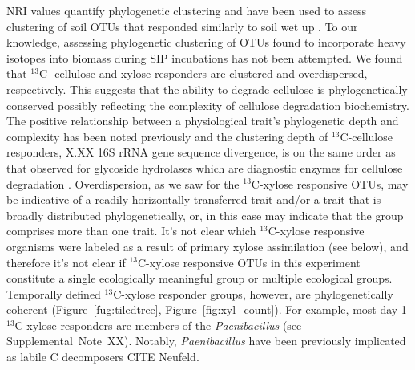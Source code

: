 NRI values quantify phylogenetic clustering \citep{Webb2000} and have 
been used to assess clustering of soil OTUs that responded similarly to soil
wet up \citep{Evans2014a,Placella2012}. To our knowledge, assessing
phylogenetic clustering of OTUs found to incorporate heavy isotopes into
biomass during SIP incubations has not been attempted. We found that $^{13}$C-
cellulose and xylose responders are clustered and overdispersed, respectively.
This suggests that the ability to degrade cellulose is phylogenetically
conserved possibly reflecting the complexity of cellulose degradation
biochemistry. The positive relationship between a physiological trait's
phylogenetic depth and complexity has been noted previously
\citep{Martiny2013a} and the clustering depth of $^{13}$C-cellulose responders,
X.XX 16S rRNA gene sequence divergence, is on the same order as that observed
for glycoside hydrolases which are diagnostic enzymes for cellulose degradation
\citep{Berlemont2013}. Overdispersion, as we saw for the $^{13}$C-xylose
responsive OTUs, may be indicative of a readily horizontally transferred trait
and/or a trait that is broadly distributed phylogenetically, or, in this case
may indicate that the group comprises more than one trait. It's not clear
which $^{13}$C-xylose responsive organisms were labeled as a result of primary
xylose assimilation (see below), and therefore it's not clear if
$^{13}$C-xylose responsive OTUs in this experiment constitute a single
ecologically meaningful group or multiple ecological groups. Temporally defined
$^{13}$C-xylose responder groups, however, are phylogenetically coherent
(Figure~\ref{fug:tiledtree}, Figure~\ref{fig:xyl_count}). For example, most day
1 $^{13}$C-xylose responders are members of the \textit{Paenibacillus} (see
Supplemental~Note~XX). Notably, \textit{Paenibacillus} have been previously
implicated as labile C decomposers CITE Neufeld.  


